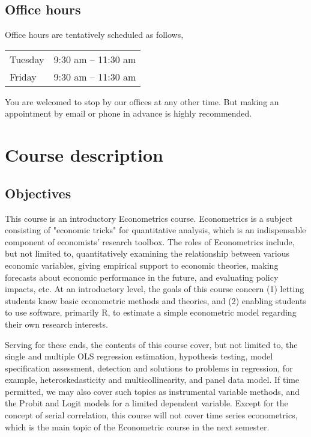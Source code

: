 \documentclass[a4paper,11pt]{article}
\begin{document}
\subsection*{Office hours}
\label{sec:org2830bcd}
Office hours are tentatively scheduled as follows,

\begin{center}
\begin{tabular}{ll}
Tuesday & 9:30 am -- 11:30 am\\
Friday & 9:30 am -- 11:30 am\\
\end{tabular}
\end{center}

You are welcomed to stop by our offices at any other time. But making
an appointment by email or phone in advance is highly recommended.


\section{Course description}
\label{sec:org5d5b15d}
\subsection*{Objectives}
\label{sec:org8856ba7}

This course is an introductory Econometrics course. Econometrics is a
subject consisting of "economic tricks" for quantitative analysis,
which is an indispensable component of economists' research
toolbox. The roles of Econometrics include, but not limited to,
quantitatively examining the relationship between various economic
variables, giving empirical support to economic theories, making
forecasts about economic performance in the future, and evaluating
policy impacts, etc. At an introductory level, the goals of this
course concern (1) letting students know basic econometric methods and
theories, and (2) enabling students to use software, primarily R, to
estimate a simple econometric model regarding their own research
interests.

Serving for these ends, the contents of this course cover, but not
limited to, the single and multiple OLS regression estimation,
hypothesis testing, model specification assessment, detection and
solutions to problems in regression, for example, heteroskedasticity
and multicollinearity, and panel data model. If time permitted, we may
also cover such topics as instrumental variable methods, and the
Probit and Logit models for a limited dependent variable. Except for
the concept of serial correlation, this course will not cover time
series econometrics, which is the main topic of the Econometric course
in the next semester.
\end{document}
